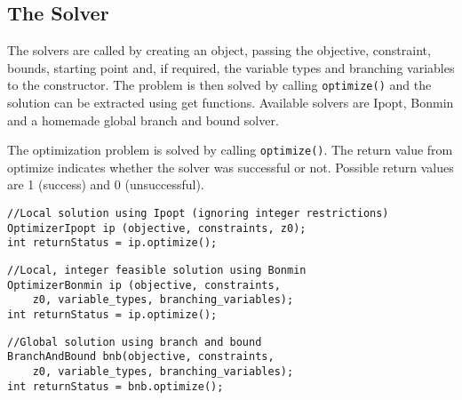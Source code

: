 \subsection{The Solver}
The solvers are called by creating an  object, passing the objective, constraint, bounds, starting point and, if required, the variable types and branching variables to the  constructor. The problem is then solved by calling \texttt{optimize()} and the solution can be extracted using get functions. Available solvers are Ipopt, Bonmin and a homemade global branch and bound solver.

The optimization problem is solved by calling \texttt{optimize()}. The return value from optimize indicates whether the solver was successful or not. Possible return values are 1 (success) and 0 (unsuccessful).

\begin{lstlisting}
//Local solution using Ipopt (ignoring integer restrictions)
OptimizerIpopt ip (objective, constraints, z0);
int returnStatus = ip.optimize();
\end{lstlisting}

\begin{lstlisting}
//Local, integer feasible solution using Bonmin
OptimizerBonmin ip (objective, constraints, 
	z0, variable_types, branching_variables);
int returnStatus = ip.optimize();
\end{lstlisting}


\begin{lstlisting}
//Global solution using branch and bound
BranchAndBound bnb(objective, constraints, 
	z0, variable_types, branching_variables);	
int returnStatus = bnb.optimize();
\end{lstlisting}


